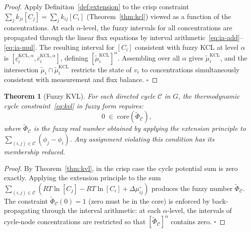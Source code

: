 \documentclass[twocolumn,10pt,a4paper]{article}
\newtheorem{theorem}{Theorem}[section]
\begin{document}
\begin{proof}
Apply Definition~\ref{def:extension} to the crisp constraint
$\sum_jk_{ji}[C_j]=\sum_jk_{ij}[C_i]$ (Theorem~\ref{thm:kcl}) viewed as a
function of the concentrations.  At each $\alpha$-level, the fuzzy intervals
for all concentrations are propagated through the linear flux equations by
interval arithmetic~\eqref{eq:ia-add}--\eqref{eq:ia-mul}.  The resulting
interval for $[C_i]$ consistent with fuzzy KCL at level $\alpha$ is
$[\underline{c}_i^{\mathrm{KCL},\alpha},\overline{c}_i^{\mathrm{KCL},\alpha}]$,
defining $[\tilde{\mu}_i^{\mathrm{KCL}}]^\alpha$.  Assembling over all $\alpha$
gives $\tilde{\mu}_i^{\mathrm{KCL}}$, and the intersection
$\tilde{\mu}_i\cap\tilde{\mu}_i^{\mathrm{KCL}}$ restricts the state of $v_i$
to concentrations simultaneously consistent with measurement and flux balance.
$\square$
\end{proof}

\begin{theorem}[Fuzzy KVL]
\label{thm:fuzzy-kvl}
For each directed cycle $\mathcal{C}$ in $G$, the thermodynamic cycle
constraint~\eqref{eq:kvl} in fuzzy form requires:
\begin{equation}
  0\;\in\;\mathrm{core}\!\left(\widetilde{\Phi}_{\mathcal{C}}\right),
  \label{eq:fuzzy-kvl}
\end{equation}
where $\widetilde{\Phi}_{\mathcal{C}}$ is the fuzzy real number obtained by
applying the extension principle to
$\sum_{(i,j)\in\mathcal{C}}(\phi_j-\phi_i)$.  Any assignment violating this
condition has its membership reduced.
\end{theorem}

\begin{proof}
By Theorem~\ref{thm:kvl}, in the crisp case the cycle potential sum is zero
exactly.  Applying the extension principle to the sum
$\sum_{(i,j)\in\mathcal{C}}(RT\ln[C_j]-RT\ln[C_i]+\Delta\mu^\circ_{ij})$
produces the fuzzy number $\widetilde{\Phi}_{\mathcal{C}}$.  The constraint
$\widetilde{\Phi}_{\mathcal{C}}(0)=1$ (zero must be in the core) is enforced
by back-propagating through the interval arithmetic: at each $\alpha$-level,
the intervals of cycle-node concentrations are restricted so that
$[\widetilde{\Phi}_{\mathcal{C}}]^\alpha$ contains zero.  $\square$
\end{proof}
\end{document}

